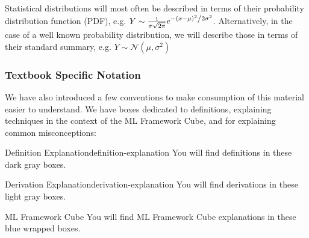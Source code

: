 Statistical distributions will most often be described in terms of their probability distribution function (PDF), e.g. $Y \sim \frac{1}{{\sigma \sqrt {2\pi } }}e^{{{ - \left( {x - \mu } \right)^2 } \mathord{\left/ {\vphantom {{ - \left( {y - \mu } \right)^2 } {2\sigma ^2 }}} \right. \kern-\nulldelimiterspace} {2\sigma ^2 }}}$. Alternatively, in the case of a well known probability distribution, we will describe those in terms of their standard summary, e.g. $Y \sim \mathcal{N}(\mu, \sigma^2)$

\subsubsection{Textbook Specific Notation}
We have also introduced a few conventions to make consumption of this material easier to understand. We have boxes dedicated to definitions, explaining techniques in the context of the ML Framework Cube, and for explaining common misconceptions: \newline

\begin{definition}{Definition Explanation}{definition-explanation}
You will find definitions in these dark gray boxes.
\end{definition}

\begin{derivation}{Derivation Explanation}{derivation-explanation}
You will find derivations in these light gray boxes.
\end{derivation}

\begin{mlcube}{ML Framework Cube}
You will find ML Framework Cube explanations in these blue wrapped boxes.
\end{mlcube}

